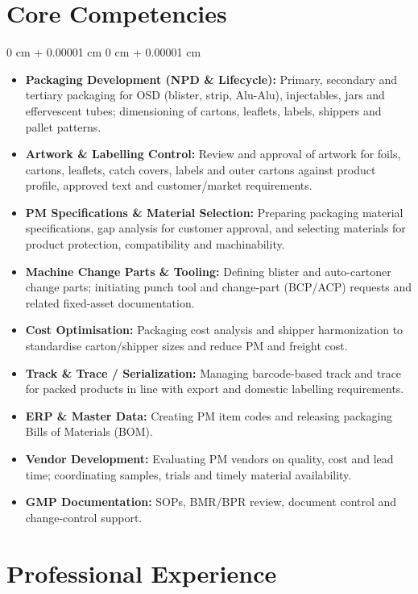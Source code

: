\documentclass[10pt, letterpaper]{article}
\newenvironment{highlights}{
    \begin{itemize}[
        topsep=0.10 cm,
        parsep=0.10 cm,
        partopsep=0pt,
        itemsep=0pt,
        leftmargin=0 cm + 10pt
    ]
}{
    \end{itemize}
} %
\newenvironment{onecolentry}{
    \begin{adjustwidth}{
        0 cm + 0.00001 cm
    }{
        0 cm + 0.00001 cm
    }
}{
    \end{adjustwidth}
} %
\begin{document}
    \section{Core Competencies}
        \begin{onecolentry}
            \begin{highlights}
                \item \textbf{Packaging Development (NPD \& Lifecycle):} Primary, secondary and tertiary packaging for OSD (blister, strip, Alu-Alu), injectables, jars and effervescent tubes; dimensioning of cartons, leaflets, labels, shippers and pallet patterns.
                \item \textbf{Artwork \& Labelling Control:} Review and approval of artwork for foils, cartons, leaflets, catch covers, labels and outer cartons against product profile, approved text and customer/market requirements.
                \item \textbf{PM Specifications \& Material Selection:} Preparing packaging material specifications, gap analysis for customer approval, and selecting materials for product protection, compatibility and machinability.
                \item \textbf{Machine Change Parts \& Tooling:} Defining blister and auto-cartoner change parts; initiating punch tool and change-part (BCP/ACP) requests and related fixed-asset documentation.
                \item \textbf{Cost Optimisation:} Packaging cost analysis and shipper harmonization to standardise carton/shipper sizes and reduce PM and freight cost.
                \item \textbf{Track \& Trace / Serialization:} Managing barcode-based track and trace for packed products in line with export and domestic labelling requirements.
                \item \textbf{ERP \& Master Data:} Creating PM item codes and releasing packaging Bills of Materials (BOM).
                \item \textbf{Vendor Development:} Evaluating PM vendors on quality, cost and lead time; coordinating samples, trials and timely material availability.
                \item \textbf{GMP Documentation:} SOPs, BMR/BPR review, document control and change-control support.
            \end{highlights}
        \end{onecolentry}

    \section{Professional Experience}
\end{document}
